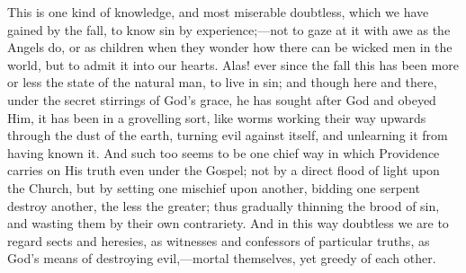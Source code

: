 This is one kind of knowledge, and most miserable doubtless, which
we have gained by the fall, to know sin by experience;—not to gaze
at it with awe as the Angels do, or as children when they wonder how
there can be wicked men in the world, but to admit it into our hearts.
Alas! ever since the fall this has been more or less the state of the
natural man, to live in sin; and though here and there, under the
secret stirrings of God's grace, he has sought after God and obeyed
Him, it has been in a grovelling sort, like worms working their way
upwards through the dust of the earth, turning evil against itself,
and unlearning it from having known it. And such too seems to be one
chief way in which Providence carries on His truth even under the
Gospel; not by a direct flood of light upon the Church, but by setting
one mischief upon another, bidding one serpent destroy another, the
less the greater; thus gradually thinning the brood of sin, and
wasting them by their own contrariety. And in this way doubtless we
are to regard sects and heresies, as witnesses and confessors of
particular truths, as God's means of destroying evil,—mortal
themselves, yet greedy of each other.


